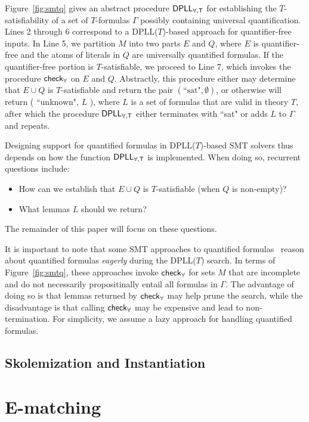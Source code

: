\documentclass[oribibl]{llncs}
\begin{document}
Figure~\ref{fig:smtq} gives an abstract procedure $\small\mathsf{DPLL_{\forall, T}}$
for establishing the $T$-satisfiability of a set of $T$-formulas $\Gamma$ possibly containing universal quantification.
Lines 2 through 6 correspond to a DPLL($T$)-based approach for quantifier-free inputs.
In Line 5, we partition $M$ into two parts $E$ and $Q$,
where $E$ is quantifier-free and the atoms of literals in $Q$ are universally quantified formulas.
If the quantifier-free portion is $T$-satisfiable,
we proceed to Line 7, which invokes the procedure $\small\mathsf{check}_\forall$ on $E$ and $Q$.
Abstractly, this procedure either may determine that $E \cup Q$ is $T$-satisfiable and return the pair $( \text{``sat"}, \emptyset )$,
or otherwise will return ( ``unknown", $L$ ), where $L$ is a set of formulas that are valid in theory $T$,
after which the procedure $\small\mathsf{DPLL_{\forall, T}}$ either terminates with ``sat" or adds $L$ to $\Gamma$ and repeats.

Designing support for quantified formulas in DPLL($T$)-based SMT solvers 
thus depends on how the function $\small\mathsf{DPLL_{\forall, T}}$ is implemented.
When doing so, recurrent questions include:
\begin{itemize}
\item How can we establish that $E \cup Q$ is $T$-satisfiable (when $Q$ is non-empty)?
\item What lemmas $L$ should we return?
\end{itemize}
The remainder of this paper will focus on these questions.

It is important to note that some SMT approaches to quantified formulas~\cite{}
reason about quantified formulas \emph{eagerly} during the DPLL($T$) search.
In terms of Figure~\ref{fig:smtq}, these approaches invoke $\small\mathsf{check}_\forall$
for sets $M$ that are incomplete and do not necessarily propositinally entail all formulas in $\Gamma$.
The advantage of doing so is that lemmas returned by $\small\mathsf{check}_\forall$ may help prune the search,
while the disadvantage is that calling $\small\mathsf{check}_\forall$ may be expensive and lead to non-termination.
For simplicity, we assume a lazy approach for handling quantified formulas.

\subsection{Skolemization and Instantiation}


\section{E-matching}
\label{sec:ematching}
\end{document}
